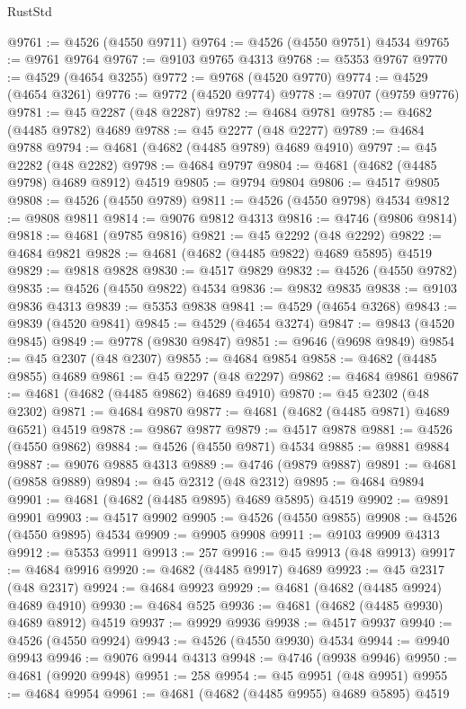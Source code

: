 \begin{lexlean}{RustStd}
\begin{coremodule}
@9761 := @4526 (@4550 @9711)
@9764 := @4526 (@4550 @9751) @4534
@9765 := @9761 @9764
@9767 := @9103 @9765 @4313
@9768 := @5353 @9767
@9770 := @4529 (@4654 @3255)
@9772 := @9768 (@4520 @9770)
@9774 := @4529 (@4654 @3261)
@9776 := @9772 (@4520 @9774)
@9778 := @9707 (@9759 @9776)
@9781 := @45 @2287 (@48 @2287)
@9782 := @4684 @9781
@9785 := @4682 (@4485 @9782) @4689
@9788 := @45 @2277 (@48 @2277)
@9789 := @4684 @9788
@9794 := @4681 (@4682 (@4485 @9789) @4689 @4910)
@9797 := @45 @2282 (@48 @2282)
@9798 := @4684 @9797
@9804 := @4681 (@4682 (@4485 @9798) @4689 @8912) @4519
@9805 := @9794 @9804
@9806 := @4517 @9805
@9808 := @4526 (@4550 @9789)
@9811 := @4526 (@4550 @9798) @4534
@9812 := @9808 @9811
@9814 := @9076 @9812 @4313
@9816 := @4746 (@9806 @9814)
@9818 := @4681 (@9785 @9816)
@9821 := @45 @2292 (@48 @2292)
@9822 := @4684 @9821
@9828 := @4681 (@4682 (@4485 @9822) @4689 @5895) @4519
@9829 := @9818 @9828
@9830 := @4517 @9829
@9832 := @4526 (@4550 @9782)
@9835 := @4526 (@4550 @9822) @4534
@9836 := @9832 @9835
@9838 := @9103 @9836 @4313
@9839 := @5353 @9838
@9841 := @4529 (@4654 @3268)
@9843 := @9839 (@4520 @9841)
@9845 := @4529 (@4654 @3274)
@9847 := @9843 (@4520 @9845)
@9849 := @9778 (@9830 @9847)
@9851 := @9646 (@9698 @9849)
@9854 := @45 @2307 (@48 @2307)
@9855 := @4684 @9854
@9858 := @4682 (@4485 @9855) @4689
@9861 := @45 @2297 (@48 @2297)
@9862 := @4684 @9861
@9867 := @4681 (@4682 (@4485 @9862) @4689 @4910)
@9870 := @45 @2302 (@48 @2302)
@9871 := @4684 @9870
@9877 := @4681 (@4682 (@4485 @9871) @4689 @6521) @4519
@9878 := @9867 @9877
@9879 := @4517 @9878
@9881 := @4526 (@4550 @9862)
@9884 := @4526 (@4550 @9871) @4534
@9885 := @9881 @9884
@9887 := @9076 @9885 @4313
@9889 := @4746 (@9879 @9887)
@9891 := @4681 (@9858 @9889)
@9894 := @45 @2312 (@48 @2312)
@9895 := @4684 @9894
@9901 := @4681 (@4682 (@4485 @9895) @4689 @5895) @4519
@9902 := @9891 @9901
@9903 := @4517 @9902
@9905 := @4526 (@4550 @9855)
@9908 := @4526 (@4550 @9895) @4534
@9909 := @9905 @9908
@9911 := @9103 @9909 @4313
@9912 := @5353 @9911
@9913 := 257
@9916 := @45 @9913 (@48 @9913)
@9917 := @4684 @9916
@9920 := @4682 (@4485 @9917) @4689
@9923 := @45 @2317 (@48 @2317)
@9924 := @4684 @9923
@9929 := @4681 (@4682 (@4485 @9924) @4689 @4910)
@9930 := @4684 @525
@9936 := @4681 (@4682 (@4485 @9930) @4689 @8912) @4519
@9937 := @9929 @9936
@9938 := @4517 @9937
@9940 := @4526 (@4550 @9924)
@9943 := @4526 (@4550 @9930) @4534
@9944 := @9940 @9943
@9946 := @9076 @9944 @4313
@9948 := @4746 (@9938 @9946)
@9950 := @4681 (@9920 @9948)
@9951 := 258
@9954 := @45 @9951 (@48 @9951)
@9955 := @4684 @9954
@9961 := @4681 (@4682 (@4485 @9955) @4689 @5895) @4519

\end{coremodule}
\end{lexlean}
